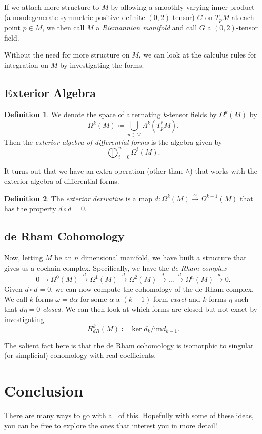 \documentclass[12pt]{article}
\newcommand{\linmap}{\overset{\sim}{\longrightarrow}}
\newcommand{\dmap}{\overset{d}{\longrightarrow}}
\theoremstyle{definition}
\newtheorem{definition}{Definition}[section]
\begin{document}
If we attach more structure to $M$ by allowing a smoothly varying inner product (a nondegenerate symmetric positive definite $(0,2)$-tensor) $G$ on $T_pM$ at each point $p \in M$, we then call $M$ a \emph{Riemannian manifold} and call $G$ a $(0,2)$-tensor field.

Without the need for more structure on $M$, we can look at the calculus rules for integration on $M$ by investigating the forms.

\subsection{Exterior Algebra}

\begin{definition}
We denote the space of alternating $k$-tensor fields by $\Omega^k(M)$ by
\[
\Omega^k(M)\coloneqq \bigcup_{p\in M} \Lambda^k(T_p^*M).
\]
Then the \emph{exterior algebra of differential forms} is the algebra given by
\[
\bigoplus_{i=0}^n \Omega^i(M).
\]
\end{definition}
It turns out that we have an extra operation (other than $\wedge$) that works with the exterior algebra of differential forms.

\begin{definition}
The \emph{exterior derivative} is a map $d\colon \Omega^k(M)\linmap \Omega^{k+1}(M)$ that has the property $d\circ d =0$.  
\end{definition}

\subsection{de Rham Cohomology}
Now, letting $M$ be an $n$ dimensional manifold, we have built a structure that gives us a cochain complex.  Specifically, we have the \emph{de Rham complex}
\[
0\to \Omega^0(M)\dmap \Omega^1(M)\dmap \Omega^2(M)\dmap \dots \dmap \Omega^n(M)\dmap 0.
\]
Given $d \circ d=0$, we can now compute the cohomology of the de Rham complex. We call $k$ forms $\omega = d\alpha$ for some $\alpha$ a $(k-1)$-form \emph{exact} and $k$ forms $\eta$ such that $d\eta=0$ \emph{closed}.  We can then look at which forms are closed but not exact by investigating
\[
H_{dR}^k(M)\coloneqq \ker{d_{k}}/\mathrm{im} d_{k-1}.
\]

The salient fact here is that the de Rham cohomology is isomorphic to singular (or simplicial) cohomology with real coefficients.  

\section{Conclusion}
There are many ways to go with all of this.  Hopefully with some of these ideas, you can be free to explore the ones that interest you in more detail!
\end{document}
